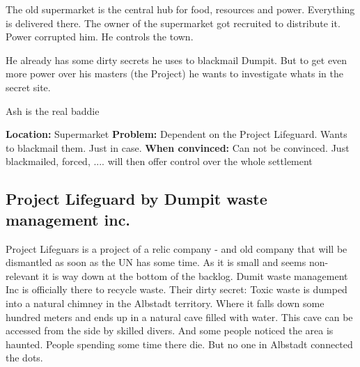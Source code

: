 \begin{npcBox}[title=Ash continued]
    
    \begin{stressSection}
    \end{stressSection}
    \begin{tabularx}{\textwidth}{ XX }
    \end{tabularx}
    
    \begin{consequences}
    \item {}
    \item {}
    \item {}
    \end{consequences}
    
    \begin{npcDescription}
    The old supermarket is the central hub for food, resources and power. Everything is delivered there. The owner of the supermarket got recruited to distribute it. Power corrupted him. He controls the town.

    He already has some dirty secrets he uses to blackmail Dumpit. But to get even more power over his masters (the Project) he wants to investigate whats in the secret site.
    
    Ash is the real baddie

    \textbf{Location:} Supermarket
    \textbf{Problem:} Dependent on the Project Lifeguard. Wants to blackmail them. Just in case.
    \textbf{When convinced:} Can not be convinced. Just blackmailed, forced, .... will then offer control over the whole settlement
    \end{npcDescription}
    
\end{npcBox}




\subsection{Project Lifeguard by Dumpit waste management inc.}

Project Lifeguars is a project of a relic company - and old company that will be dismantled as soon as the UN has some time. As it is small and seems non-relevant it is way down at the bottom of the backlog.
Dumit waste management Inc is officially there to recycle waste. Their dirty secret: Toxic waste is dumped into a natural chimney in the Albstadt territory. Where it falls down some hundred meters and ends up in a natural cave filled with water. This cave can be accessed from the side by skilled divers. And some people noticed the area is haunted. People spending some time there die. But no one in Albstadt connected the dots.

